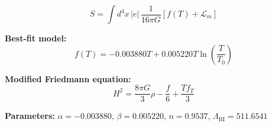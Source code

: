 
\begin{equation}
  S = \int d^4x \, |e| \, \frac{1}{16\pi G} \left[ f(T) + \mathcal{L}_m \right]
\end{equation}

\textbf{Best-fit model:}
\begin{equation}
  f(T) = -0.003880 T + 0.005220 T \ln\!\left(\frac{T}{T_0}\right)
\end{equation}

\textbf{Modified Friedmann equation:}
\begin{equation}
  H^2 = \frac{8\pi G}{3} \rho - \frac{f}{6} + \frac{T f_T}{3}
\end{equation}

\textbf{Parameters:}
$\alpha = -0.003880$, \quad
$\beta = 0.005220$, \quad
$n = 0.9537$, \quad
$\Lambda_{\text{BI}} = 511.6541$